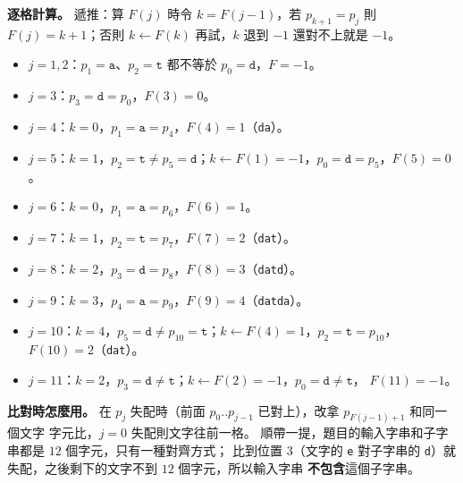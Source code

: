 \begin{pastsoln}
\textbf{逐格計算。} 遞推：算 $F(j)$ 時令 $k = F(j-1)$，若 $p_{k+1} = p_j$ 則 $F(j) = k + 1$；否則
$k \gets F(k)$ 再試，$k$ 退到 $-1$ 還對不上就是 $-1$。
\begin{itemize}
\item $j = 1, 2$：$p_1 = \mathtt{a}$、$p_2 = \mathtt{t}$ 都不等於 $p_0 = \mathtt{d}$，$F = -1$。
\item $j = 3$：$p_3 = \mathtt{d} = p_0$，$F(3) = 0$。
\item $j = 4$：$k = 0$，$p_1 = \mathtt{a} = p_4$，$F(4) = 1$（\texttt{da}）。
\item $j = 5$：$k = 1$，$p_2 = \mathtt{t} \ne p_5 = \mathtt{d}$；$k \gets F(1) = -1$，$p_0 = \mathtt{d} = p_5$，$F(5) = 0$。
\item $j = 6$：$k = 0$，$p_1 = \mathtt{a} = p_6$，$F(6) = 1$。
\item $j = 7$：$k = 1$，$p_2 = \mathtt{t} = p_7$，$F(7) = 2$（\texttt{dat}）。
\item $j = 8$：$k = 2$，$p_3 = \mathtt{d} = p_8$，$F(8) = 3$（\texttt{datd}）。
\item $j = 9$：$k = 3$，$p_4 = \mathtt{a} = p_9$，$F(9) = 4$（\texttt{datda}）。
\item $j = 10$：$k = 4$，$p_5 = \mathtt{d} \ne p_{10} = \mathtt{t}$；$k \gets F(4) = 1$，$p_2 = \mathtt{t} = p_{10}$，
$F(10) = 2$（\texttt{dat}）。
\item $j = 11$：$k = 2$，$p_3 = \mathtt{d} \ne \mathtt{t}$；$k \gets F(2) = -1$，$p_0 = \mathtt{d} \ne \mathtt{t}$，
$F(11) = -1$。
\end{itemize}

\textbf{比對時怎麼用。} 在 $p_j$ 失配時（前面 $p_0..p_{j-1}$ 已對上），改拿 $p_{F(j-1)+1}$ 和同一個文字
字元比，$j = 0$ 失配則文字往前一格。 順帶一提，題目的輸入字串和子字串都是 $12$ 個字元，只有一種對齊方式；
比到位置 $3$（文字的 \texttt{e} 對子字串的 \texttt{d}）就失配，之後剩下的文字不到 $12$ 個字元，所以輸入字串
\textbf{不包含}這個子字串。
\end{pastsoln}
